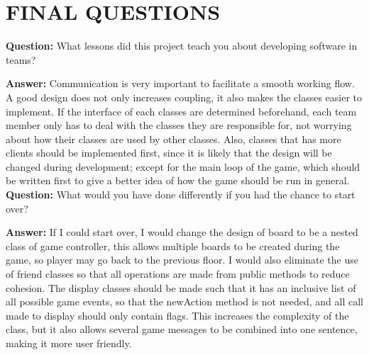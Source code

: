 \documentclass[11pt]{article}
\theoremstyle{plain} \newtheorem{theorem*}{Theorem}[subsection]
\begin{document}

\section{FINAL QUESTIONS}

\textbf{Question:}
What lessons did this project teach you about developing software in teams? 

\textbf{Answer:}
Communication is very important to facilitate a smooth working flow. A good
design does not only increases coupling, it also makes the classes easier to
implement. If the interface of each classes are determined beforehand, each
team member only has to deal with the classes they are responsible for, not
worrying about how their classes are used by other classes. Also, classes
that has more clients should be implemented first, since it is likely that the
design will be changed during development; except for the main loop of the
game, which should be written first to give a better idea of how the game
should be run in general.  \\

\textbf{Question:}
What would you have done differently if you had the chance to start over? 

\textbf{Answer:}
If I could start over, I would change the design of board to be a nested class
of game controller, this allows multiple boards to be created during the game,
so player may go back to the previous floor. I would also eliminate the use of
friend classes so that all operations are made from public methods to reduce
cohesion. The display classes should be made such that it has an inclusive list
of all possible game events, so that the newAction method is not needed, and
all call made to display should only contain flags. This increases the
complexity of the class, but it also allows several game messages to be
combined into one sentence, making it more user friendly.  \\
\end{document}
